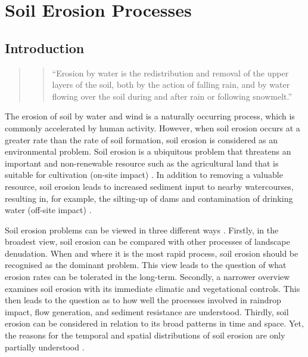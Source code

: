 \section{Soil Erosion Processes}
\label{sec:SoilErosionProcesses}

\subsection{Introduction}
\label{sec:ErosionProcessesIntroduction}

\begin{quote}
  \begin{quote}
    ``Erosion by water is the redistribution and removal of the
upper layers of the soil, both by the action of falling rain, and by water
flowing over the soil during and after rain or following snowmelt.''
\citep{favis-mortlock2002-452}
  \end{quote}
\end{quote}

The erosion of soil by water and wind is a naturally occurring process, which is
commonly accelerated by human activity. However, when soil erosion occurs at a
greater rate than the rate of soil formation, soil erosion is considered as an
environmental problem. Soil erosion is a ubiquitous problem that threatens an
important and non-renewable resource such as the agricultural land that is
suitable for cultivation (on-site impact) \citep{boardman2003-176}. In addition
to removing a valuable resource, soil erosion leads to increased sediment input
to nearby watercourses, resulting in, for example, the silting-up of dams and
contamination of drinking water (off-site impact)
\citep{mejia1994-331,kitchen1998-179}.

Soil erosion problems can be viewed in three different ways
\citep{kirkby1980-312}. Firstly, in the broadest view, soil erosion can be
compared with other processes of landscape denudation. When and where it is the
most rapid process, soil erosion should be recognised as the dominant problem.
This view leads to the question of what erosion rates can be tolerated in the
long-term. Secondly, a narrower overview examines soil erosion with its
immediate climatic and vegetational controls. This then leads to the question as
to how well the processes involved in raindrop impact, flow generation, and
sediment resistance are understood. Thirdly, soil erosion can be considered in
relation to its broad patterns in time and space. Yet, the reasons for the
temporal and spatial distributions of soil erosion are only partially understood
\citep{quine2002-55,gomez2005-143,wakiyama2010-993}.

